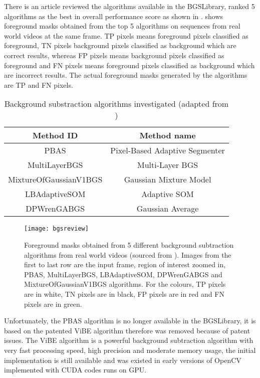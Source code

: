 There is an article \cite{bgs:article} reviewed the algorithms available in the BGSLibrary, ranked 5 algorithms as the best in overall performance score as shown in .  shows foreground masks obtained from the top 5 algorithms on sequences from real world videos at the same frame. TP pixels means foreground pixels classified as foreground, TN pixels background pixels classified as background which are correct results, whereas FP pixels means background pixels classified as foreground and FN pixels means foreground pixels classified as background which are incorrect results. The actual foreground masks generated by the algorithms are TP and FN pixels.

\begin{table}[H]
  \centering
  \begin{tabular}{cc}
  \toprule
  \textbf{Method ID} & \textbf{Method name}\\
  \midrule
  PBAS & Pixel-Based Adaptive Segmenter \\
  MultiLayerBGS & Multi-Layer BGS \\
  MixtureOfGaussianV1BGS & Gaussian Mixture Model \\
  LBAdaptiveSOM & Adaptive SOM \\
  DPWrenGABGS & Gaussian Average \\
  \bottomrule
  \end{tabular}
  \caption{Background substraction algorithms investigated (adapted from \cite{bgslibrary})}
  \label{Table:bgs}
\end{table}

\begin{figure}[tbh]
  \centering
  \texttt{[image: bgsreview]}
  \caption{Foreground masks obtained from 5 different background subtraction algorithms from real world videos (sourced from \cite{bgs:article}). Images from the first to last row are the input frame, region of interest zoomed in, PBAS, MultiLayerBGS, LBAdaptiveSOM, DPWrenGABGS and MixtureOfGaussianV1BGS algorithms. For the colours, TP pixels are in white, TN pixels are in black, FP pixels are in red and FN pixels are in green.}
  \label{bgsreview}
\end{figure}

Unfortunately, the PBAS algorithm is no longer available in the BGSLibrary, it is based on the patented ViBE algorithm \cite{barnich2011vibe} therefore was removed because of patent issues. The ViBE algorithm is a powerful background subtraction algorithm with very fast processing speed, high precision and moderate memory usage, the initial implementation is still available and was existed in early versions of OpenCV implemented with CUDA codes runs on GPU.

